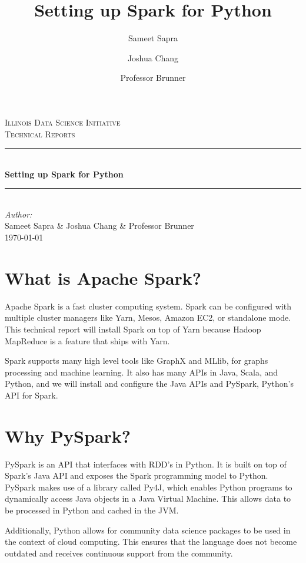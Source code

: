 \documentclass[9pt,twocolumn,twoside]{idsi}
\author[1]{Sameet Sapra}
\author[2]{Joshua Chang}
\author[3]{Professor Brunner}
\title{Setting up Spark for Python}
\newcommand{\HRule}{\rule{\linewidth}{0.5mm}}
\begin{document}
\begin{titlepage}
\center 
\textsc{\LARGE Illinois Data Science Initiative}\\[1.5cm] 
\textsc{\Large Technical Reports}\\[0.5cm] \HRule \\[0.4cm]
{\huge \bfseries Setting up Spark for Python } \\[0.4cm] \HRule \\[1.5cm]
\Large \emph{Author:}\\ Sameet Sapra \& Joshua Chang \& Professor Brunner\\[3cm]
{\large \today}\\[3cm] %
\vfill
\end{titlepage}
%

\maketitle

\section{What is Apache Spark?}

Apache Spark is a fast cluster computing system. Spark can be configured with multiple cluster managers like Yarn, Mesos, Amazon EC2, or standalone mode. This technical report will install Spark on top of Yarn because Hadoop MapReduce is a feature that ships with Yarn.

Spark supports many high level tools like GraphX and MLlib, for graphs processing and machine learning. It also has many APIs in Java, Scala, and Python, and we will install and configure the Java APIs and PySpark, Python's API for Spark.

\section{Why PySpark?}

PySpark is an API that interfaces with RDD's in Python. It is built on top of Spark's Java API and exposes the Spark programming model to Python. PySpark makes use of a library called Py4J, which enables Python programs to dynamically access Java objects in a Java Virtual Machine. This allows data to be processed in Python and cached in the JVM.

Additionally, Python allows for community data science packages to be used in the context of cloud computing. This ensures that the language does not become outdated and receives continuous support from the community.
\end{document}

